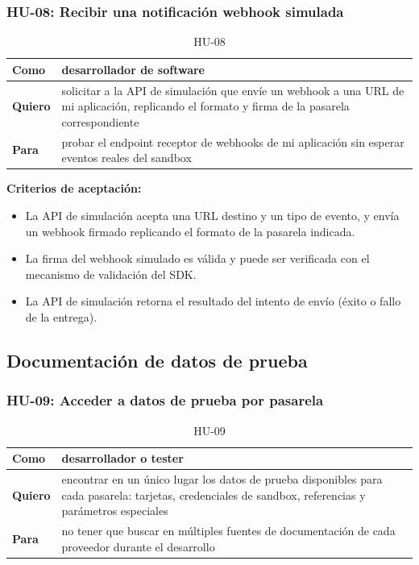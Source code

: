 \documentclass[10pt]{article}
\begin{document}
\subsubsection{HU-08: Recibir una notificación webhook simulada}
\begin{table}[htbp]
  \centering
  \renewcommand{\arraystretch}{1.2}
  \begin{tabularx}{\textwidth}{|l|X|}
    \hline
    \textbf{Como} & desarrollador de software \\
    \hline
    \textbf{Quiero} & solicitar a la API de simulación que envíe un webhook a una URL de mi aplicación, replicando el formato y firma de la pasarela correspondiente \\
    \hline
    \textbf{Para} & probar el endpoint receptor de webhooks de mi aplicación sin esperar eventos reales del sandbox \\
    \hline
  \end{tabularx}
  \caption{HU-08}
  \label{tab:hu-08}
\end{table}

\textbf{Criterios de aceptación:}
\begin{itemize}
  \item La API de simulación acepta una URL destino y un tipo de evento, y envía un webhook firmado replicando el formato de la pasarela indicada.
  \item La firma del webhook simulado es válida y puede ser verificada con el mecanismo de validación del SDK.
  \item La API de simulación retorna el resultado del intento de envío (éxito o fallo de la entrega).
\end{itemize}

\subsection{Documentación de datos de prueba}

\subsubsection{HU-09: Acceder a datos de prueba por pasarela}
\begin{table}[htbp]
  \centering
  \renewcommand{\arraystretch}{1.2}
  \begin{tabularx}{\textwidth}{|l|X|}
    \hline
    \textbf{Como} & desarrollador o tester \\
    \hline
    \textbf{Quiero} & encontrar en un único lugar los datos de prueba disponibles para cada pasarela: tarjetas, credenciales de sandbox, referencias y parámetros especiales \\
    \hline
    \textbf{Para} & no tener que buscar en múltiples fuentes de documentación de cada proveedor durante el desarrollo \\
    \hline
  \end{tabularx}
  \caption{HU-09}
  \label{tab:hu-09}
\end{table}
\end{document}
